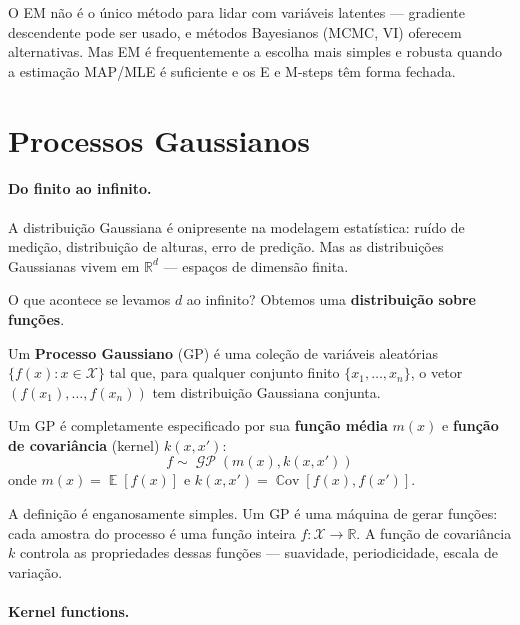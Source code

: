 \documentclass{tufte-handout}
\DeclareMathOperator{\E}{\mathbb{E}}
\DeclareMathOperator{\Cov}{\mathbb{C}\text{ov}}
\DeclareMathOperator{\GP}{\mathcal{GP}}
\begin{document}
\begin{remark}
    O EM não é o único método para lidar com variáveis latentes --- gradiente descendente pode ser usado, e métodos Bayesianos (MCMC, VI) oferecem alternativas. Mas EM é frequentemente a escolha mais simples e robusta quando a estimação MAP/MLE é suficiente e os E e M-steps têm forma fechada.
\end{remark}

\section{Processos Gaussianos}

\paragraph{Do finito ao infinito.}

A distribuição Gaussiana é onipresente na modelagem estatística: ruído de medição, distribuição de alturas, erro de predição. Mas as distribuições Gaussianas vivem em $\mathbb{R}^d$ --- espaços de dimensão finita.

O que acontece se levamos $d$ ao infinito? Obtemos uma \textbf{distribuição sobre funções}.

\begin{defn}
    Um \textbf{Processo Gaussiano} (GP) é uma coleção de variáveis aleatórias $\{f(x) : x \in \mathcal{X}\}$ tal que, para qualquer conjunto finito $\{x_1, \dots, x_n\}$, o vetor $(f(x_1), \dots, f(x_n))$ tem distribuição Gaussiana conjunta.
    
    Um GP é completamente especificado por sua \textbf{função média} $m(x)$ e \textbf{função de covariância} (kernel) $k(x, x')$:
    \[
    f \sim \GP(m(x), k(x, x'))
    \]
    onde $m(x) = \E[f(x)]$ e $k(x, x') = \Cov[f(x), f(x')]$.
\end{defn}

A definição é enganosamente simples. Um GP é uma máquina de gerar funções: cada amostra do processo é uma função inteira $f: \mathcal{X} \to \mathbb{R}$. A função de covariância $k$ controla as propriedades dessas funções --- suavidade, periodicidade, escala de variação.

\paragraph{Kernel functions.}
\end{document}
